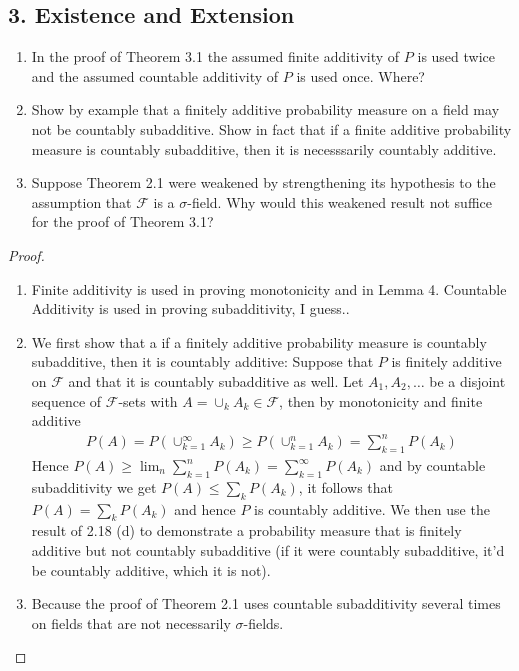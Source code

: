 \documentclass[11pt]{article}
\newcommand{\F}{\mathcal{F}}
\newcommand{\mc}{\mathcal}
\newenvironment{exercise}[2][Exercise]{\begin{trivlist}
\item[\hskip \labelsep {\bfseries #1}\hskip \labelsep {\bfseries #2.}]}{\end{trivlist}}
\begin{document}
\subsection*{3. Existence and Extension}
\begin{exercise}{3.1}
    \begin{enumerate}
        \item In the proof of Theorem 3.1 the assumed finite additivity of $P$ is used twice and the assumed countable additivity of $P$ is used once. Where?
        \item Show by example that a finitely additive probability measure on a field may not be countably subadditive. Show in fact that if a finite additive probability measure is countably subadditive, then it is necesssarily countably additive.
        \item Suppose Theorem 2.1 were weakened by strengthening its hypothesis to the assumption that $\mc F$ is a $\sigma$-field. Why would this weakened result not suffice for the proof of Theorem 3.1?
    \end{enumerate}
\end{exercise}
\begin{proof}
    \begin{enumerate}
        \item Finite additivity is used in proving monotonicity and in Lemma 4. Countable Additivity is used in proving subadditivity, I guess..
        \item We first show that a if a finitely additive probability measure is countably subadditive, then it is countably additive: Suppose that $P$ is finitely additive on $\F$ and that it is countably subadditive as well. Let $A_1, A_2, \ldots$ be a disjoint sequence of $\F$-sets with $A = \cup_k A_k \in \F$, then by monotonicity and finite additive
        \begin{align*}
            P(A) = P\left ( \cup_{k=1}^{\infty} A_k \right ) \geq P \left ( \cup_{k=1}^{n} A_k \right) = \sum_{k=1}^{n} P(A_k) 
        \end{align*}
        Hence $P(A) \geq \lim_n \sum_{k=1}^{n} P(A_k) = \sum_{k=1}^{\infty} P(A_k)$ and by countable subadditivity we get $P(A) \leq \sum_k P(A_k)$, it follows that $P(A) = \sum_k P(A_k)$ and hence $P$ is countably additive. We then use the result of 2.18 (d) to demonstrate a probability measure that is finitely additive but not countably subadditive (if it were countably subadditive, it'd be countably additive, which it is not).
        \item Because the proof of Theorem 2.1 uses countable subadditivity several times on fields that are not necessarily $\sigma$-fields.
    \end{enumerate}
\end{proof}
\end{document}
